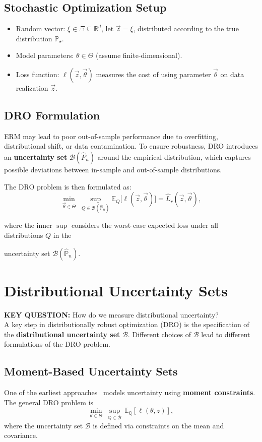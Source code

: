 \documentclass[11pt]{report}
\begin{document}
\subsection{Stochastic Optimization Setup}
\begin{itemize}[left=1em]
    \item Random vector: $\xi \in \Xi \subseteq \mathbb{R}^d$, let $\vec{z} = \xi$, distributed according to the true distribution $\mathbb{P}_\star$.  
    \item Model parameters: $\theta \in \Theta$ (assume finite-dimensional).  
    \item Loss function: $\ell(\vec{z}, \vec{\theta})$ measures the cost of using parameter $\vec{\theta}$ on data realization $\vec{z}$.  
\end{itemize}

\subsection{DRO Formulation}
ERM may lead to poor out-of-sample performance due to overfitting, distributional shift, or data contamination.  
To ensure robustness, DRO introduces an \textbf{uncertainty set} $\mathcal{B}(\hat{P}_n)$ around the empirical distribution, which captures possible deviations between in-sample and out-of-sample distributions.

The DRO problem is then formulated as:
\begin{equation}
    \min_{\vec{\theta} \in \Theta} \; \sup_{Q \in \mathcal{B}(\hat{\mathbb{P}}_n)} 
    \mathbb{E}_{Q} \big[ \ell(\vec{z}, \vec{\theta}) \big] = \hat{L}_r(\vec{z}, \vec{\theta}),
\end{equation}

where the inner $\sup$ considers the worst-case expected loss under all distributions $Q$ in the 

uncertainty set $\mathcal{B}(\hat{\mathbb{P}}_n)$.
\newpage 
\section{Distributional Uncertainty Sets}
\textbf{KEY QUESTION:} How do we measure distributional uncertainty?
\\
A key step in distributionally robust optimization (DRO) is the specification of the \textbf{distributional uncertainty set} $\mathcal{B}$. Different choices of $\mathcal{B}$ lead to different formulations of the DRO problem.

\subsection{Moment-Based Uncertainty Sets}
One of the earliest approaches~\cite{delage2010distributionally} models uncertainty using \textbf{moment constraints}.  
The general DRO problem is
\[
    \min_{\theta \in \Theta} \; \sup_{\mathbb{Q} \in \mathcal{B}} \, \mathbb{E}_\mathbb{Q}[\ell(\theta, z)],
\]
where the uncertainty set $\mathcal{B}$ is defined via constraints on the mean and covariance.
\end{document}
